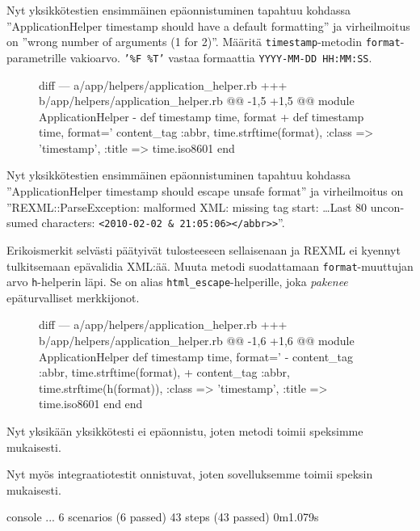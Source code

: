 \documentclass{article}
\newenvironment{myfigure}[1][tbp]{
  \begin{figure}[#1]
    \centering
    \begin{lrbox}{\myfigurebox}
      \begin{minipage}{\textwidth}
}{
      \end{minipage}
    \end{lrbox}
    \colorbox{blue!4}{\usebox{\myfigurebox}}
  \end{figure}
}
\newcommand{\pdfforeignlanguage}[2]{\texorpdfstring{\foreignlanguage{#1}{#2}}{#2}}
\newcommand{\eng}[1]{\pdfforeignlanguage{english}{#1}}
\begin{document}
\begin{samepage}
Nyt yksikkötestien ensimmäinen epäonnistuminen tapahtuu kohdassa
''\eng{ApplicationHelper timestamp should have a default formatting}'' ja
virheilmoitus on ''\eng{wrong number of arguments (1 for 2)}''. Määritä
\texttt{timestamp}-metodin \texttt{format}-parametrille vakioarvo. \texttt{'\%F
\%T'} vastaa formaattia \texttt{YYYY-MM-DD HH:MM:SS}.

\begin{myfigure}[H]
\begin{pygmented}{diff}
--- a/app/helpers/application_helper.rb
+++ b/app/helpers/application_helper.rb
@@ -1,5 +1,5 @@
 module ApplicationHelper
-  def timestamp time, format
+  def timestamp time, format='%
     content_tag :abbr, time.strftime(format),
                 :class => 'timestamp', :title => time.iso8601
   end
\end{pygmented}
\end{myfigure}
\end{samepage}

Nyt yksikkötestien ensimmäinen epäonnistuminen tapahtuu kohdassa
''\eng{ApplicationHelper timestamp should escape unsafe format}'' ja
virheilmoitus on ''\eng{REXML::ParseException: malformed XML: missing tag
start: \dots Last 80 unconsumed characters: \texttt{<2010-02-02 \&
21:05:06></abbr>>}}''.

\begin{samepage}
Erikoismerkit selvästi päätyivät tulosteeseen sellaisenaan ja REXML ei kyennyt
tulkitsemaan epävalidia XML:ää. Muuta metodi suodattamaan
\texttt{format}-muuttujan arvo \texttt{h}-helperin läpi. Se on \eng{alias}
\texttt{html\_escape}-helperille, joka \emph{pakenee} epäturvalliset
merkkijonot.

\begin{myfigure}[H]
\begin{pygmented}{diff}
--- a/app/helpers/application_helper.rb
+++ b/app/helpers/application_helper.rb
@@ -1,6 +1,6 @@
 module ApplicationHelper
   def timestamp time, format='%
-    content_tag :abbr, time.strftime(format),
+    content_tag :abbr, time.strftime(h(format)),
                 :class => 'timestamp', :title => time.iso8601
   end
 end
\end{pygmented}
\end{myfigure}
\end{samepage}

Nyt yksikään yksikkötesti ei epäonnistu, joten metodi toimii speksimme
mukaisesti.

\begin{samepage}
Nyt myös integraatiotestit onnistuvat, joten sovelluksemme toimii speksin
mukaisesti.

\begin{pygmented}{console}
...
6 scenarios (6 passed)
43 steps (43 passed)
0m1.079s
\end{pygmented}
\end{samepage}
\end{document}
